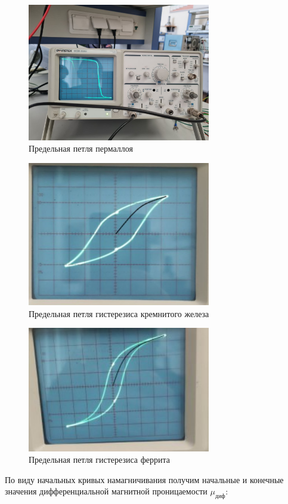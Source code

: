 \documentclass[a4paper,12pt]{article} %
\begin{document}
\begin{enumerate}
  \begin{figure}[h!]
    \centering
    \includegraphics[width=8cm]{11.jpeg}
    \caption{Предельная петля пермаллоя}
  \end{figure}
  \begin{figure}[h!]
    \centering
    \includegraphics[width=8cm]{22.jpg}
    \caption{Предельная петля гистерезиса кремнитого железа}
  \end{figure}
  \newpage
  \begin{figure}[h!]
    \centering
    \includegraphics[width=8cm]{3333.jpg}
    \caption{Предельная петля гистерезиса феррита}
  \end{figure}

  По виду начальных кривых намагничивания получим начальные и конечные значения дифференциальной магнитной проницаемости $\mu_{диф}$:




\end{enumerate}
\end{document}
